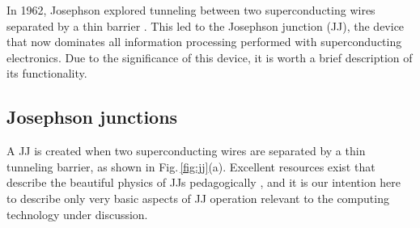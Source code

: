 \documentclass[twocolumn]{article}
\begin{document}
In 1962, Josephson explored tunneling between two superconducting wires separated by a thin barrier \cite{jo1962}. This led to the Josephson junction (JJ), the device that now dominates all information processing performed with superconducting electronics. Due to the significance of this device, it is worth a brief description of its functionality. 

\subsection{Josephson junctions}
\begin{figure} 
\end{figure}
A JJ is created when two superconducting wires are separated by a thin tunneling barrier, as shown in Fig.\,\ref{fig:jj}(a). Excellent resources exist that describe the beautiful physics of JJs pedagogically \cite{ti1996,vatu1998,ka1999}, and it is our intention here to describe only very basic aspects of JJ operation relevant to the computing technology under discussion. 
\end{document}
